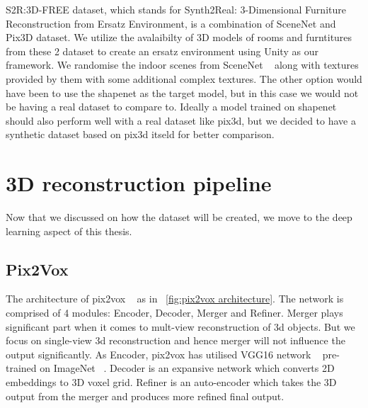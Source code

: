 S2R:3D-FREE dataset, which stands for Synth2Real: 3-Dimensional Furniture Reconstruction from Ersatz Environment, is a combination of SceneNet and Pix3D dataset.
We utilize the avalaibilty of 3D models of rooms and furntitures from these 2 dataset to create an ersatz environment using Unity as our framework.
We randomise the indoor scenes from SceneNet ~\cite{McCormac:etal:ICCV2017} along with textures provided by them with some additional complex textures.
The other option would have been to use the shapenet as the target model, but in this case we would not be having a real dataset to compare to.
Ideally a model trained on shapenet should also perform well with a real dataset like pix3d, but we decided to have a synthetic dataset based on pix3d itseld for better comparison.


\section{3D reconstruction pipeline}
Now that we discussed on how the dataset will be created, we move to the deep learning aspect of this thesis.
\subsection{Pix2Vox}
The architecture of pix2vox ~\cite{Xie_2019} as in ~\ref{fig:pix2vox architecture}.
The network is comprised of 4 modules: Encoder, Decoder, Merger and Refiner.
Merger plays significant part when it comes to mult-view reconstruction of 3d objects.
But we focus on single-view 3d reconstruction and hence merger will not influence the output significantly.
As Encoder, pix2vox has utilised VGG16 network ~\cite{simonyan2015deep} pre-trained on ImageNet ~\cite{Deng2009ImageNetAL}.
Decoder is an expansive network which converts 2D embeddings to 3D voxel grid.
Refiner is an auto-encoder which takes the 3D output from the merger and produces more refined final output.

